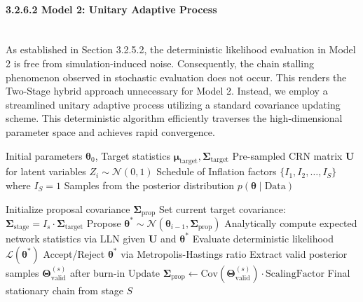 \paragraph{3.2.6.2 Model 2: Unitary Adaptive Process}\mbox{}\\
As established in Section 3.2.5.2, the deterministic likelihood evaluation in Model 2 is free from simulation-induced noise.
Consequently, the chain stalling phenomenon observed in stochastic evaluation does not occur.
This renders the Two-Stage hybrid approach unnecessary for Model 2.
Instead, we employ a streamlined unitary adaptive process utilizing a standard covariance updating scheme.
This deterministic algorithm efficiently traverses the high-dimensional parameter space and achieves rapid convergence.

\begin{algorithm}[H]
\caption{Adaptive MCMC for Model 2 (Deterministic Evaluation)}
\begin{algorithmic}[1]
\Require Initial parameters $\boldsymbol{\theta}_0$, Target statistics $\boldsymbol{\mu}_{\text{target}}, \boldsymbol{\Sigma}_{\text{target}}$
\Require Pre-sampled CRN matrix $\mathbf{U}$ for latent variables $Z_i \sim \mathcal{N}(0,1)$
\Require Schedule of Inflation factors $\{I_1, I_2, \dots, I_S\}$ where $I_S = 1$
\Ensure Samples from the posterior distribution $p(\boldsymbol{\theta} \mid \text{Data})$

\State Initialize proposal covariance $\boldsymbol{\Sigma}_{\text{prop}}$
    \State Set current target covariance: $\boldsymbol{\Sigma}_{\text{stage}} = I_s \cdot \boldsymbol{\Sigma}_{\text{target}}$
        \State Propose $\boldsymbol{\theta}^* \sim \mathcal{N}(\boldsymbol{\theta}_{i-1}, \boldsymbol{\Sigma}_{\text{prop}})$
        \State Analytically compute expected network statistics via LLN given $\mathbf{U}$ and $\boldsymbol{\theta}^*$
        \State Evaluate deterministic likelihood $\mathcal{L}(\boldsymbol{\theta}^*)$
        \State Accept/Reject $\boldsymbol{\theta}^*$ via Metropolis-Hastings ratio
    \EndFor
    \State Extract valid posterior samples $\boldsymbol{\Theta}_{\text{valid}}^{(s)}$ after burn-in
    \State Update $\boldsymbol{\Sigma}_{\text{prop}} \gets \mathrm{Cov}(\boldsymbol{\Theta}_{\text{valid}}^{(s)}) \cdot \text{ScalingFactor}$
\EndFor
\State \Return Final stationary chain from stage $S$
\end{algorithmic}
\end{algorithm}


